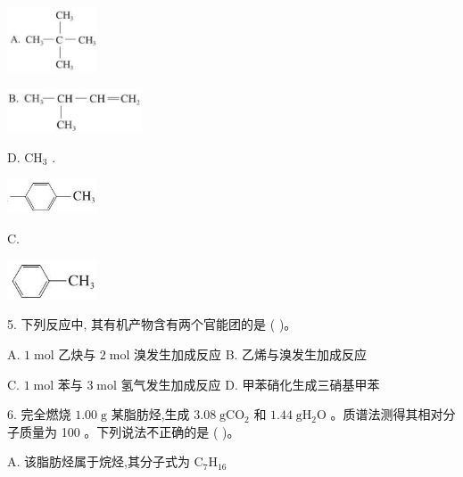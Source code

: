 \documentclass[10pt]{article}
\begin{document}
\begin{center}
\includegraphics[max width=0.2\textwidth]{images/0190efc5-b58a-7c43-bfb0-e0a030df9cfd_56_153431.jpg}
\end{center}

\begin{center}
\includegraphics[max width=0.3\textwidth]{images/0190efc5-b58a-7c43-bfb0-e0a030df9cfd_56_622004.jpg}
\end{center}

D. \({\mathrm{{CH}}}_{3}\) .

\begin{center}
\includegraphics[max width=0.2\textwidth]{images/0190efc5-b58a-7c43-bfb0-e0a030df9cfd_56_328175.jpg}
\end{center}

C.

\begin{center}
\includegraphics[max width=0.2\textwidth]{images/0190efc5-b58a-7c43-bfb0-e0a030df9cfd_56_605317.jpg}
\end{center}

5. 下列反应中, 其有机产物含有两个官能团的是 ( )。

A. \(1\mathrm{\;{mol}}\) 乙炔与 \(2\mathrm{\;{mol}}\) 溴发生加成反应 B. 乙烯与溴发生加成反应

C. \(1\mathrm{\;{mol}}\) 苯与 \(3\mathrm{\;{mol}}\) 氢气发生加成反应 D. 甲苯硝化生成三硝基甲苯

6. 完全燃烧 \({1.00}\mathrm{\;g}\) 某脂肪烃,生成 \({3.08}\mathrm{\;g}{\mathrm{{CO}}}_{2}\) 和 \({1.44}\mathrm{\;g}{\mathrm{H}}_{2}\mathrm{O}\) 。质谱法测得其相对分子质量为 100 。下列说法不正确的是 ( )。

A. 该脂肪烃属于烷烃,其分子式为 \({\mathrm{C}}_{7}{\mathrm{H}}_{16}\)
\end{document}
